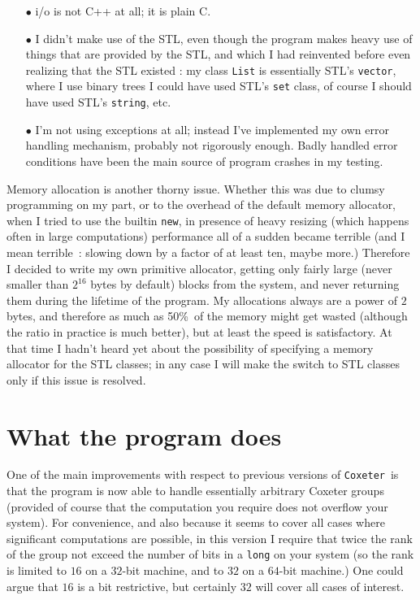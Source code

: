 \documentclass[11pt]{article}
\newcommand{\coxeter}{{\tt Coxeter}}
\begin{document}
\begin{itemize} pt
\item[$\bullet$]i/o is not C++ at all; it is plain C.
\item[$\bullet$]I didn't make use of the STL, even though the program makes
heavy use of things that are provided by the STL, and which I had reinvented
before even realizing that the STL existed : my class {\tt List} is
essentially STL's {\tt vector}, where I use binary trees I could have used
STL's {\tt set} class, of course I should have used STL's {\tt string}, etc.
\item[$\bullet$]I'm not using exceptions at all; instead I've implemented
my own error handling mechanism, probably not rigorously enough. Badly
handled error conditions have been the main source of program crashes in
my testing.
\end{itemize}

\noindent Memory allocation is another thorny issue. Whether this was due to
clumsy programming on my part, or to the overhead of the default memory 
allocator, when I tried to use the builtin {\tt new}, in presence of heavy
resizing (which happens often in large computations) performance all of a 
sudden became terrible (and I mean terrible~: slowing down by a factor of at 
least ten, maybe more.) Therefore I decided to write my own primitive 
allocator, getting only fairly large (never smaller than $2^{16}$ bytes by 
default) blocks from the system, and never returning them during the lifetime 
of the program. My allocations always are a power of $2$ bytes, and therefore
as much as 50\%\ of the memory might get wasted (although the ratio in
practice is much better), but at least the speed is satisfactory. At that
time I hadn't heard yet about the possibility of specifying a memory
allocator for the STL classes; in any case I will make the switch to STL 
classes only if this issue is resolved.

\section{What the program does}\label{section:does}

One of the main improvements with respect to previous versions of \coxeter\ is
that the program is now able to handle essentially arbitrary Coxeter groups
(provided of course that the computation you require does not overflow your 
system). For convenience, and also because it seems to cover all cases where
significant computations are possible, in this version I require that 
twice the rank of the group not exceed the number of bits in a {\tt long}
on your system (so the rank is limited to $16$ on a $32$-bit machine, and
to $32$ on a $64$-bit machine.) One could argue that $16$ is a bit restrictive,
but certainly $32$ will cover all cases of interest.
\end{document}
